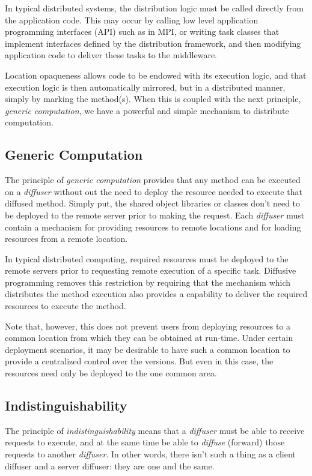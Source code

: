 \documentclass[11pt]{article}
\begin{document}
In typical distributed systems, the distribution logic must be called directly from the application code. This may occur by calling low level application programming interfaces (API) such as in MPI, or writing task classes that implement interfaces defined by the distribution framework, and then modifying application code to deliver these tasks to the middleware.

Location opaqueness allows code to be endowed with its execution logic, and that execution logic is then automatically mirrored, but in a distributed manner, simply by marking the method(s). When this is coupled with the next principle, \emph{generic computation}, we have a powerful and simple mechanism to distribute computation.

\subsection{Generic Computation}
The principle of \emph{generic computation} provides that any method can be executed on a \emph{diffuser} without out the need to deploy the resource needed to execute that diffused method. Simply put, the shared object libraries or classes don't need to be deployed to the remote server prior to making the request. Each \emph{diffuser} must contain a mechanism for providing resources to remote locations and for loading resources from a remote location.

In typical distributed computing, required resources must be deployed to the remote servers prior to requesting remote execution of a specific task. Diffusive programming removes this restriction by requiring that the mechanism which distributes the method execution also provides a capability to deliver the required resources to execute the method. 

Note that, however, this does not prevent users from deploying resources to a common location from which they can be obtained at run-time. Under certain deployment scenarios, it may be desirable to have such a common location to provide a centralized control over the versions. But even in this case, the resources need only be deployed to the one common area.

\subsection{Indistinguishability}
The principle of \emph{indistinguishability} means that a \emph{diffuser} must be able to receive requests to execute, and at the same time be able to \emph{diffuse} (forward) those requests to another \emph{diffuser}. In other words, there isn't such a thing as a client diffuser and a server diffuser: they are one and the same.
\end{document}

